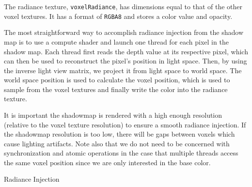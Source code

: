 The radiance texture, \texttt{voxelRadiance}, has dimensions equal to that of the other voxel textures. It has a format of \texttt{RGBA8} and stores a color value and opacity.

The most straightforward way to accomplish radiance injection from the shadow map is to use a compute shader and launch one thread for each pixel in the shadow map. Each thread first reads the depth value at its respective pixel, which can then be used to reconstruct the pixel's position in light space. Then, by using the inverse light view matrix, we project it from light space to world space. The world space position is used to calculate the voxel position, which is used to sample from the voxel textures and finally write the color into the radiance texture.

It is important the shadowmap is rendered with a high enough resolution (relative to the voxel texture resolution) to ensure a smooth radiance injection. If the shadowmap resolution is too low, there will be gaps between voxels which cause lighting artifacts. Note also that we do not need to be concerned with synchronization and atomic operations in the case that multiple threads access the same voxel position since we are only interested in the base color.



\begin{algorithm}
    \caption{Radiance Injection}
    \label{alg:radianceinjection}
    \begin{algorithmic}
         
         
        \EndFor
    \end{algorithmic}
\end{algorithm}

